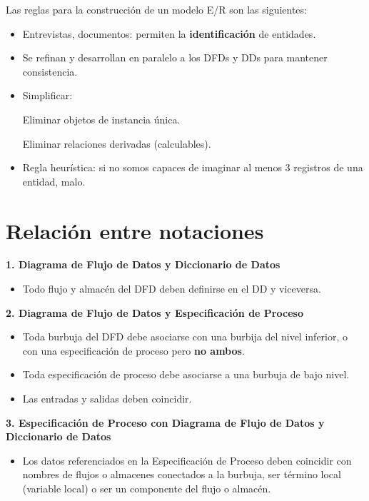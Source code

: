 Las reglas para la construcción de un modelo E/R son las siguientes:

\begin{itemize}[noitemsep]
\item Entrevistas, documentos: permiten la \textbf{identificación} de entidades.
\item Se refinan y desarrollan en paralelo a los DFDs y DDs para mantener consistencia.
\item Simplificar:

  Eliminar objetos de instancia única.

  Eliminar relaciones derivadas (calculables).

\item Regla heurística: si no somos capaces de imaginar al menos 3 registros de una entidad, malo.
\end{itemize}

\section{Relación entre notaciones}

\textbf{1. Diagrama de Flujo de Datos y Diccionario de Datos}

\begin{itemize}[noitemsep]
\item Todo flujo y almacén del DFD deben definirse en el DD y viceversa.
\end{itemize}

\textbf{2. Diagrama de Flujo de Datos y Especificación de Proceso}

\begin{itemize}[noitemsep]
\item Toda burbuja del DFD debe asociarse con una burbija del nivel inferior, o con una especificación de proceso pero \textbf{no ambos}.
\item Toda especificación de proceso debe asociarse a una burbuja de bajo nivel.
\item Las entradas y salidas deben coincidir.
\end{itemize}

\textbf{3. Especificación de Proceso con Diagrama de Flujo de Datos y Diccionario de Datos}

\begin{itemize}[noitemsep]
\item Los datos referenciados en la Especificación de Proceso deben coincidir con nombres de flujos o almacenes conectados a la burbuja, ser término local (variable local) o ser un componente del flujo o almacén.
\end{itemize}

